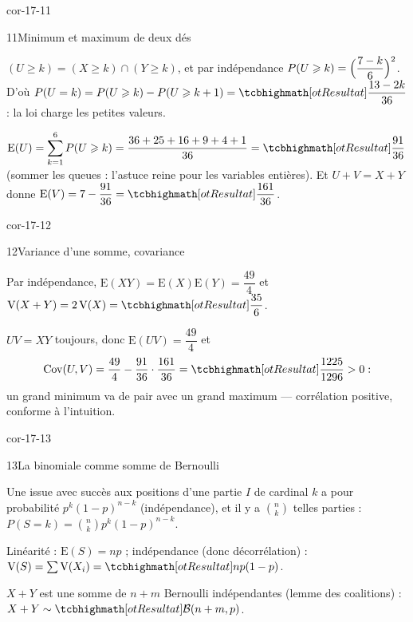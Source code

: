 \begin{blocLivre}{cor-17-11}
\begin{corrige}{11}{Minimum et maximum de deux dés}
\begin{questions}
  \item $(U\geqslant k)=(X\geqslant k)\cap(Y\geqslant k)$, et par
    indépendance $P(U\geqslant k)=\Bigl(\dfrac{7-k}{6}\Bigr)^{2}$. D'où
    $P(U=k)=P(U\geqslant k)-P(U\geqslant k+1)=\res{\dfrac{13-2k}{36}}$ :
    la loi charge les petites valeurs.
  \item $\mathrm{E}(U)=\displaystyle\sum_{k=1}^{6}P(U\geqslant k)
    =\frac{36+25+16+9+4+1}{36}=\res{\frac{91}{36}}$ (sommer les queues :
    l'astuce reine pour les variables entières). Et $U+V=X+Y$ donne
    $\mathrm{E}(V)=7-\dfrac{91}{36}=\res{\dfrac{161}{36}}$.
\end{questions}
\end{corrige}
\end{blocLivre}

\begin{blocLivre}{cor-17-12}
\begin{corrige}{12}{Variance d'une somme, covariance}
\begin{questions}
  \item Par indépendance,
    $\mathrm{E}(XY)=\mathrm{E}(X)\mathrm{E}(Y)=\dfrac{49}{4}$ et
    $\mathrm{V}(X+Y)=2\,\mathrm{V}(X)=\res{\dfrac{35}{6}}$.
  \item $UV=XY$ toujours, donc
    $\mathrm{E}(UV)=\dfrac{49}{4}$ et
    \[
    \operatorname{Cov}(U,V)=\frac{49}{4}-\frac{91}{36}\cdot\frac{161}{36}
    =\res{\frac{1225}{1296}}>0 :
    \]
    un grand minimum va de pair avec un grand maximum — corrélation
    positive, conforme à l'intuition.
\end{questions}
\end{corrige}
\end{blocLivre}

\begin{blocLivre}{cor-17-13}
\begin{corrige}{13}{La binomiale comme somme de Bernoulli}
\begin{questions}
  \item Une issue avec succès aux positions d'une partie $I$ de cardinal
    $k$ a pour probabilité $p^{k}(1-p)^{n-k}$ (indépendance), et il y a
    $\binom nk$ telles parties : $P(S=k)=\binom nk p^{k}(1-p)^{n-k}$.
  \item Linéarité : $\mathrm{E}(S)=np$ ; indépendance (donc
    décorrélation) : $\mathrm{V}(S)=\sum\mathrm{V}(X_i)=\res{np(1-p)}$.
  \item $X+Y$ est une somme de $n+m$ Bernoulli indépendantes (lemme des
    coalitions) : $X+Y\sim\res{\mathcal{B}(n+m,p)}$.
\end{questions}
\end{corrige}
\end{blocLivre}

